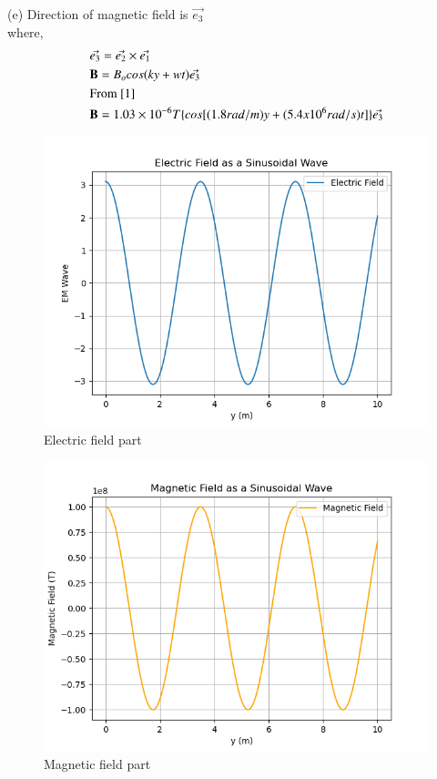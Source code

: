 \documentclass[journal,12pt,twocolumn]{IEEEtran}
\theoremstyle{remark}
\begin{document}
(e)
Direction of magnetic field is $\vec{e_3}$\\
where,
\begin{align}
	&\vec{e_3}=\vec{e_2} \times \vec{e_1}\\
	&\textbf{B}=B_ocos(ky+wt)\vec{e_3}\\
	&\notag\text{From \eqref{1}}\\
	&\textbf{B}=1.03\times10^{-6}T\{cos[(1.8rad/m)y+(5.4x10^{6}rad/s)t]\}\vec{e_3}
\end{align}
\begin{figure}[h]
\centering
\includegraphics[width=1.25\columnwidth]{Ewave.png}
\caption{Electric field part}
\label{solution}
\end{figure}
\begin{figure}[h]
\centering
\includegraphics[width=1.25\columnwidth]{Mwave.png}
\caption{Magnetic field part}
\label{solution}
\end{figure}
\end{document}
